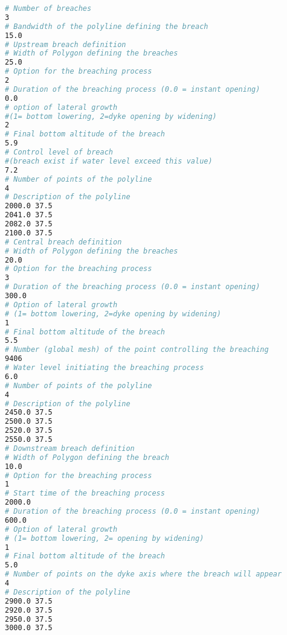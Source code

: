 \begin{lstlisting}[language=bash]
# Number of breaches
3
# Bandwidth of the polyline defining the breach
15.0
# Upstream breach definition
# Width of Polygon defining the breaches
25.0
# Option for the breaching process
2
# Duration of the breaching process (0.0 = instant opening)
0.0
# option of lateral growth
#(1= bottom lowering, 2=dyke opening by widening)
2
# Final bottom altitude of the breach
5.9
# Control level of breach 
#(breach exist if water level exceed this value)
7.2
# Number of points of the polyline
4
# Description of the polyline
2000.0 37.5
2041.0 37.5
2082.0 37.5
2100.0 37.5
# Central breach definition
# Width of Polygon defining the breaches
20.0
# Option for the breaching process
3
# Duration of the breaching process (0.0 = instant opening)
300.0
# Option of lateral growth
# (1= bottom lowering, 2=dyke opening by widening)
1
# Final bottom altitude of the breach
5.5
# Number (global mesh) of the point controlling the breaching
9406
# Water level initiating the breaching process
6.0
# Number of points of the polyline
4
# Description of the polyline
2450.0 37.5
2500.0 37.5
2520.0 37.5
2550.0 37.5
# Downstream breach definition
# Width of Polygon defining the breach
10.0
# Option for the breaching process
1
# Start time of the breaching process
2000.0
# Duration of the breaching process (0.0 = instant opening)
600.0
# Option of lateral growth
# (1= bottom lowering, 2= opening by widening)
1
# Final bottom altitude of the breach
5.0
# Number of points on the dyke axis where the breach will appear
4
# Description of the polyline
2900.0 37.5
2920.0 37.5
2950.0 37.5
3000.0 37.5
\end{lstlisting}
